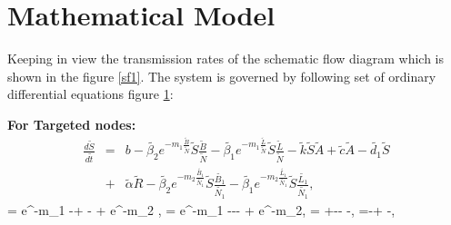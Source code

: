 \section{Mathematical Model} 
Keeping in view the transmission rates of the schematic flow diagram which is shown in the figure \ref{sf1}. The system is governed by following set of ordinary differential
equations figure \ref{}:

\textbf{For Targeted nodes:}\\
\begin{eqnarray}
\frac{d\tilde{S}}{d\tilde{t}} &=& b-\tilde{\beta_2} e^{-m_1 \frac{\tilde{B}}{\tilde{N}}}\tilde{S} \frac{\tilde{B}}{\tilde{N}}-\tilde{\beta_1} e^{-m_1\frac{\tilde{L}}{\tilde{N}}} \tilde{S}\frac{\tilde{L}}{\tilde{N}}-\tilde{k}\tilde{S}\tilde{A}+\tilde{c}\tilde{A}-\tilde{d_1}\tilde{S} \nonumber \\ 
&+&\tilde{\alpha} \tilde{R}-\tilde{\beta_2} e^{-m_2 \frac{\tilde{B_1}}{\tilde{N_1}}} \tilde{S} \frac{\tilde{B_1}}{\tilde{N_1}} -\tilde{\beta_1} e^{-m_2 \frac{\tilde{L_1}}{\tilde{N_1}}} \tilde{S} \frac{\tilde{L_1}}{\tilde{N_1}},
\label{se1}
\end{eqnarray}
\be
{}= e^{-m_1 } -+\tilde{\epsilon} -\tilde{\gamma} + e^{-m_2}
,
\label{se2}
\ee
\be
{}= e^{-m_1} --\tilde{\epsilon}-\tilde{\delta} +
 e^{-m_2},
\label{se3}
\ee
\be
{}=\tilde{\gamma} +\tilde{\delta}--\tilde{\alpha} -,
\label{se4}
\ee
\be
{}=-+  -,
\label{se5}
\ee

